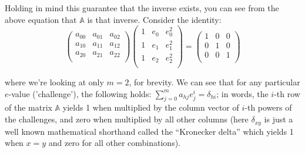 \documentclass[10pt,a4paper]{article}
\begin{document}
Holding in mind this guarantee that the inverse exists, you can see from
the above equation that $\mathbb{A}$ is that inverse. Consider the identity:
\[
\begin{pmatrix}
a_{00} & a_{01} &a_{02} \\
a_{10} & a_{11} &a_{12} \\
a_{20} & a_{21} &a_{22} \\
\end{pmatrix}
\begin{pmatrix}
1 & e_0 & e_0^2\\
1 & e_1 & e_1^2\\
1 & e_2 & e_2^2\\
\end{pmatrix}
=\begin{pmatrix}
1 & 0 &0 \\
0 & 1 &0 \\
0 & 0 &1 \\
\end{pmatrix}
\]

where we're looking at only $m=2$, for brevity. We can see that for any
particular $e$-value ('challenge'), the following holds: $\sum_{j=0}^{m} a_{hj}e_j^{i} = \delta_{hi}$; in words, the
$i$-th row of the matrix $\mathbb{A}$ yields 1 when multiplied by the column vector of
$i$-th powers of the challenges, and zero when multiplied by all other
columns (here $\delta_{xy}$ is just a well known mathematical shorthand called the
``Kronecker delta'' which yields 1 when $x=y$ and zero for all other
combinations).
\end{document}
